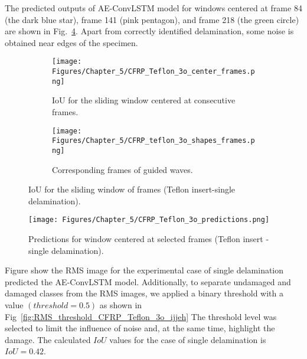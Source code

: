 The predicted outputs of AE-ConvLSTM model for windows centered at frame 84 (the dark blue star), frame 141 (pink pentagon), and frame 218 (the green circle) are shown in Fig.~\ref{fig:CFRP_Teflon_3o_predictions}.
Apart from correctly identified delamination, some noise is obtained near edges of the specimen.
\begin{figure} [!h]
	\begin{subfigure}[b]{1\textwidth}
		\centering
		\texttt{[image: Figures/Chapter\_5/CFRP\_Teflon\_3o\_center\_frames.png]}
		\caption{IoU for the sliding window centered at consecutive frames.}
		\label{fig:CFRP_Teflon_3o_center_frames}
	\end{subfigure}
	\begin{subfigure}[b]{1\textwidth}
		\centering
		\texttt{[image: Figures/Chapter\_5/CFRP\_teflon\_3o\_shapes\_frames.png]}
		\caption{Corresponding frames of guided waves.} 
		\label{fig:CFRP_teflon_3o_preds_frames}
	\end{subfigure}
	\caption{IoU for the sliding window of frames (Teflon insert-single delamination).}
	\label{fig:CFRP_Teflon_3o_IoU_centre_window}
\end{figure} 
\begin{figure}[!ht]
	\centering
	\texttt{[image: Figures/Chapter\_5/CFRP\_Teflon\_3o\_predictions.png]}
	\caption{Predictions for window centered at selected frames (Teflon insert - single delamination).}
	\label{fig:CFRP_Teflon_3o_predictions}
\end{figure}
Figure show the RMS image for the experimental case of single delamination predicted the AE-ConvLSTM model.
Additionally, to separate undamaged and damaged classes from the RMS images, we applied a binary threshold with a value \((threshold=0.5)\) as shown in Fig~\ref{fig:RMS_threshold_CFRP_Teflon_3o_ijjeh} 
The threshold level was selected to limit the influence of noise and, at the same time, highlight the damage.
The calculated \(IoU\) values for the case of single delamination is \(IoU=0.42\).


